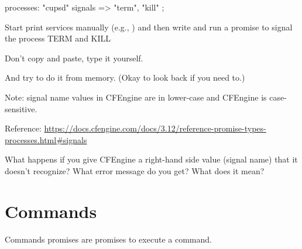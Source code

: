 \begin{code}
processes:
    "cupsd"
        signals => { "term", "kill" };
\end{code}





\begin{aside}
\label{aside:exercise_11}

Start print services manually (e.g., ) and then write and run a promise to signal the  process
TERM and KILL

Don't copy and paste, type it yourself.

And try to do it from memory.  (Okay to look back if you need to.)

Note: signal name values in CFEngine are in lower-case and CFEngine
is case-sensitive.

Reference:
\href{https://docs.cfengine.com/docs/3.12/reference-promise-types-processes.html#signals}{https://docs.cfengine.com/docs/3.12/reference-promise-types-processes.html\#signals}

What happens if you give CFEngine a right-hand side value (signal name)
that it doesn't recognize? What error message do you get? What does it
mean?

\end{aside}





\section{Commands}

Commands promises are promises to execute a command.

